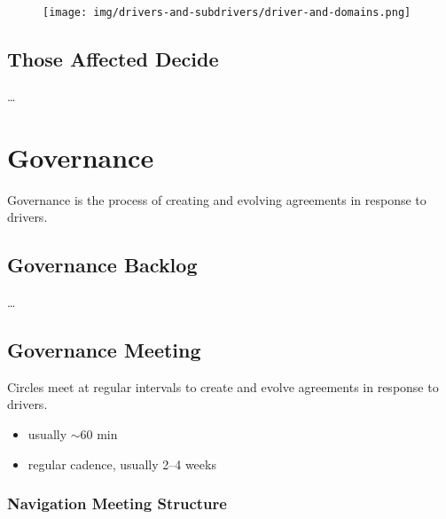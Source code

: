 \begin{figure}[htbp]
\centering
\texttt{[image: img/drivers-and-subdrivers/driver-and-domains.png]}
\end{figure}

\section{Those Affected Decide}
\label{thoseaffecteddecide}

{\ldots}

\chapter{Governance}
\label{governance}

Governance is the process of creating and evolving agreements in response to drivers.

\section{Governance Backlog}
\label{governancebacklog}

{\ldots}

\section{Governance Meeting}
\label{governancemeeting}

Circles meet at regular intervals to create and evolve agreements in response to drivers.

\begin{itemize}
\item usually \ensuremath{\sim}60 min

\item regular cadence, usually 2--4 weeks

\end{itemize}

\subsection{Navigation Meeting Structure}
\label{navigationmeetingstructure}

